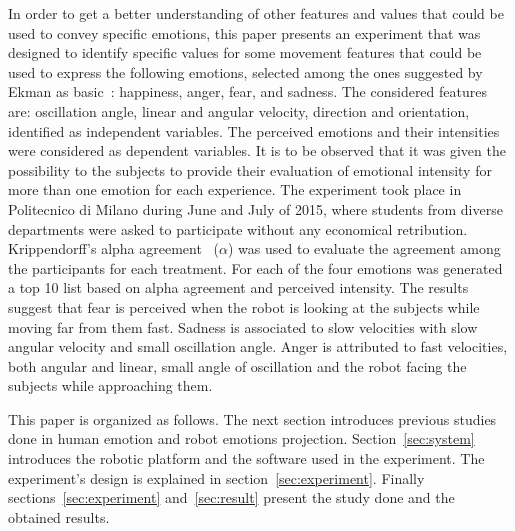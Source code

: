 In order to get a better understanding of other features and values that could be used to convey specific emotions, this paper presents an experiment that was designed to identify specific values for some movement features that could be used to express the following emotions, selected among the ones suggested by Ekman as basic~\cite{Ekman2004}: happiness, anger, fear, and sadness. The considered features are: oscillation angle, linear and angular velocity, direction and orientation, identified as independent variables. The perceived emotions and their intensities were considered as dependent variables. It is to be observed that it was given the possibility to the subjects to provide their evaluation of emotional intensity for more than one emotion for each experience. The experiment took place in Politecnico di Milano during June and July of 2015, where students from diverse departments were asked to participate without any economical retribution. Krippendorff's alpha agreement~\cite{Krippendorff2007} ($\alpha$) was used to evaluate the agreement among the participants for each treatment. For each of the four emotions was generated a top 10 list based on alpha agreement and perceived intensity. The results suggest that fear is perceived when the robot is looking at the subjects while moving far from them fast. Sadness is associated to slow velocities with slow angular velocity and small oscillation angle. Anger is attributed to fast velocities, both angular and linear, small angle of oscillation and the robot facing the subjects while approaching them.

This paper is organized as follows. The next section introduces previous studies done in human emotion and robot emotions projection. Section~\ref{sec:system} introduces the robotic platform and the software used in the experiment. The experiment's design is explained in section~\ref{sec:experiment}. Finally sections~\ref{sec:experiment} and~\ref{sec:result} present the study done and the obtained results.